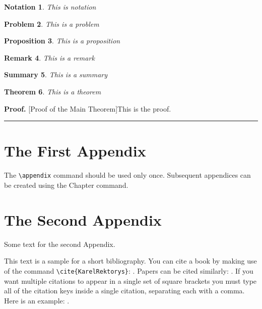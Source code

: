 \documentclass[letterpaper,12pt,openany,reqno]{book}%
\newtheorem{theorem}{Theorem}
\newtheorem{notation}[theorem]{Notation}
\newtheorem{problem}[theorem]{Problem}
\newtheorem{proposition}[theorem]{Proposition}
\newtheorem{remark}[theorem]{Remark}
\newtheorem{summary}[theorem]{Summary}
\newenvironment{proof}[1][Proof]{\textbf{#1.} }{\ \rule{0.5em}{0.5em}}
\begin{document}
\begin{notation}
This is notation
\end{notation}

\begin{problem}
This is a problem
\end{problem}

\begin{proposition}
This is a proposition
\end{proposition}

\begin{remark}
This is a remark
\end{remark}

\begin{summary}
This is a summary
\end{summary}

\begin{theorem}
This is a theorem
\end{theorem}

\begin{proof}
[Proof of the Main Theorem]This is the proof.
\end{proof}

\appendix

\chapter{The First Appendix}

The \verb"\appendix" command should be used only once. Subsequent appendices can
be created using the Chapter command.

\chapter{The Second Appendix}

Some text for the second Appendix.

This text is a sample for a short bibliography. You can cite a book by making use of
the command \verb"\cite{KarelRektorys}": \cite{KarelRektorys}. Papers can be cited
similarly: \cite{Bertoti97}. If you want multiple citations to appear in a single set
of square brackets you must type all of the citation keys inside a single citation,
separating each with a comma. Here is an example: \cite{Bertoti97, Szeidl2001,
Carlson67}.
\end{document}
